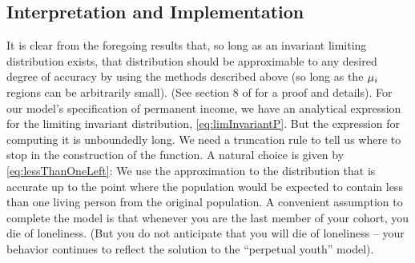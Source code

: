 \documentclass[\econtexRoot/BufferStockTheory.tex]{subfiles}
\begin{document}
\subsection{Interpretation and Implementation}
It is clear from the foregoing results that, so long as an invariant limiting distribution exists, that distribution should be approximable to any desired degree of accuracy by using the methods described above (so long as the $\mu_{i}$ regions can be arbitrarily small).  (See section 8 of \cite{saQuantitative} for a proof and details).
For our model's specification of permanent income, we have an analytical expression for the limiting invariant distribution, \eqref{eq:limInvariantP}.  But the expression for computing it is unboundedly long.
We need a truncation rule to tell us where to stop in the construction of the function.
A natural choice is given by \eqref{eq:lessThanOneLeft}: We use the approximation to the distribution that is accurate up to the point where the population would be expected to contain less than one living person from the original population.
A convenient assumption to complete the model is that whenever you are the last member of your cohort, you die of loneliness.  (But you do not anticipate that you will die of loneliness -- your behavior continues to reflect the solution to the ``perpetual youth'' model).
\begin{comment}
  Since in practice we will only ever be simulating the model over a finite time horizon (call it $\tMax$, one option would be to select multiple of $\tMax$.  But as we are likely to be simulating thousands of periods, this would generate an analytical expression with thousands of terms which would likely be costly to evaluate.
  If we are simulating the population in addition to constructing a discrete Markov chain, a natural choice is to choose the number of terms $\tAbs$ in such a way that the population mass corresponding to the truncated portion of the series is ``small'' relative to the number of persons.
  However, the procedure for constructing an infinite horizon version of that approximation requires a slight modification of the method described above, which applies for any finite time interval.  The modification is that the probability mass associated with the unbounded portion of $\SetFullCnts$ needs to be redistributed to the bounded interval, while preserving the mean.
  The most natural choice is to redistribute the portion of the distribution that lives above $\Top{\SetPartCnts}_{\NumAprxStes}$ into $\SetPartCnts_{\NumAprxStes}$ and the portion that lives below $\Bot{\SetPartCnts}_{1}$ into $\SetPartCnts_{1}$.
\end{comment}
\end{document}
